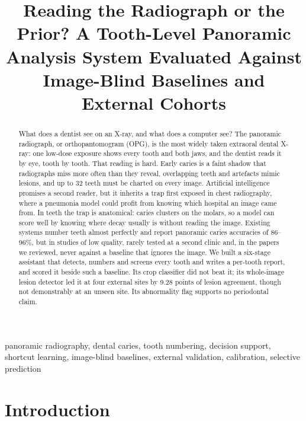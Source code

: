 \documentclass[conference]{IEEEtran}
\begin{document}
\title{Reading the Radiograph or the Prior? A Tooth-Level Panoramic Analysis System Evaluated Against Image-Blind Baselines and External Cohorts}
\author{
}
\maketitle
\begin{abstract}
What does a dentist see on an X-ray, and what does a computer see? The panoramic radiograph, or orthopantomogram (OPG), is the most widely taken extraoral dental X-ray: one low-dose exposure shows every tooth and both jaws, and the dentist reads it by eye, tooth by tooth. That reading is hard. Early caries is a faint shadow that radiographs miss more often than they reveal, overlapping teeth and artefacts mimic lesions, and up to 32 teeth must be charted on every image. Artificial intelligence promises a second reader, but it inherits a trap first exposed in chest radiography, where a pneumonia model could profit from knowing which hospital an image came from. In teeth the trap is anatomical: caries clusters on the molars, so a model can score well by knowing where decay usually is without reading the image. Existing systems number teeth almost perfectly and report panoramic caries accuracies of 86–96\%, but in studies of low quality, rarely tested at a second clinic and, in the papers we reviewed, never against a baseline that ignores the image. We built a six-stage assistant that detects, numbers and screens every tooth and writes a per-tooth report, and scored it beside such a baseline. Its crop classifier did not beat it; its whole-image lesion detector led it at four external sites by 9.28 points of lesion agreement, though not demonstrably at an unseen site. Its abnormality flag supports no periodontal claim.
\end{abstract}
\begin{IEEEkeywords}
panoramic radiography, dental caries, tooth numbering, decision support, shortcut learning, image-blind baselines, external validation, calibration, selective prediction
\end{IEEEkeywords}

\section{Introduction}
\end{document}
